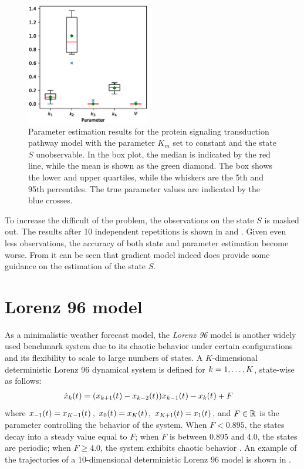 \begin{figure}
    \centering
    \includegraphics[width=0.48\textwidth]{graphics/protein-parameters-without-km-partial}
    \caption{Parameter estimation results for the protein signaling transduction pathway model with the parameter $K_m$ set to constant and the state $S$ unobservable. In the box plot, the median is indicated by the red line, while the mean is shown as the green diamond. The box shows the lower and upper quartiles, while the whiskers are the 5th and 95th percentiles. The true parameter values are indicated by the blue crosses.}
    \label{fig-protein-parameters-partial-without-km}
\end{figure}

To increase the difficult of the problem, the observations on the state $S$ is masked out.
The results after 10 independent repetitions is shown in  and .
Given even less observations, the accuracy of both state and parameter estimation become worse.
From  it can be seen that gradient model indeed does provide some guidance on the estimation of the state $S$.

\section{Lorenz 96 model}
\label{sec-lorenz-96}

As a minimalistic weather forecast model, the \emph{Lorenz 96} model \citep{lorenz1996predictability} is another widely used benchmark system due to its chaotic behavior under certain configurations and its flexibility to scale to large numbers of states.
A $K$-dimensional deterministic Lorenz 96 dynamical system is defined for $k = 1,\dots,K$, state-wise as follows:
\begin{align}
    \dot{x}_{k}(t_{})
     & = (x_{k+1}(t_{}) - x_{k-2}(t_{}))x_{k-1}(t_{}) - x_{k}(t_{}) + F
    \label{eq-lorenz-96-drift}
\end{align}
where $x_{-1}(t_{}) = x_{K-1}(t_{})$, $x_{0}(t_{}) = x_{K}(t_{})$, $x_{K+1}(t_{})=x_{1}(t_{})$, and $F \in \mathbb{R}$ is the parameter controlling the behavior of the system.
When $F < 0.895$, the states decay into a steady value equal to $F$; when $F$ is between 0.895 and 4.0, the states are periodic; when $F \geqslant 4.0$, the system exhibits chaotic behavior \citep{vrettas2015variational}.
An example of the trajectories of a 10-dimensional deterministic Lorenz 96 model is shown in .

